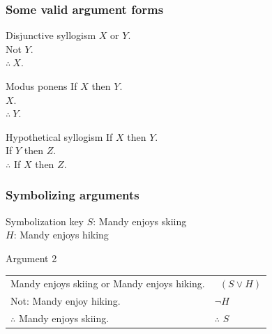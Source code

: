 \begin{frame}
  \frametitle{Some valid argument forms}

  \begin{block}{Disjunctive syllogism}
  $X$ or $Y$.\\
  Not $Y$.\\
  $\therefore\ X.$
  \end{block}

  \begin{block}{Modus ponens}
  If $X$ then $Y$.\\
  $X$.\\
  $\therefore\ Y.$
  \end{block}

  \begin{block}{Hypothetical syllogism}
  If $X$ then $Y$.\\
  If $Y$ then $Z$.\\
  $\therefore$ If $X$ then $Z$.
  \end{block}
\end{frame}

\begin{frame}
  \frametitle{Symbolizing arguments}

  \begin{block}{Symbolization key}
  $S$: Mandy enjoys skiing\\
  $H$: Mandy enjoys hiking
  \end{block}

  \begin{block}{Argument 2}
    \begin{tabular}{@{}l@{}l@{}}
      Mandy enjoys skiing or Mandy enjoys hiking.  & \ \emph{$(S \lor H)$}\\
      Not: Mandy enjoy hiking. & \emph{$\lnot H$}\\
      $\therefore$ Mandy enjoys skiing. & $\therefore$ \emph{$S$}
    \end{tabular}
  \end{block}
\end{frame}

